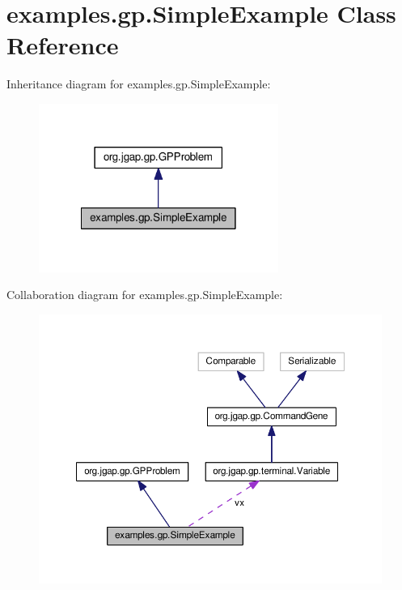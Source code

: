 \hypertarget{classexamples_1_1gp_1_1_simple_example}{\section{examples.\-gp.\-Simple\-Example Class Reference}
\label{classexamples_1_1gp_1_1_simple_example}
}


Inheritance diagram for examples.\-gp.\-Simple\-Example\-:
\nopagebreak
\begin{figure}[H]
\begin{center}
\leavevmode
\includegraphics[width=222pt]{classexamples_1_1gp_1_1_simple_example__inherit__graph}
\end{center}
\end{figure}


Collaboration diagram for examples.\-gp.\-Simple\-Example\-:
\nopagebreak
\begin{figure}[H]
\begin{center}
\leavevmode
\includegraphics[width=350pt]{classexamples_1_1gp_1_1_simple_example__coll__graph}
\end{center}
\end{figure}
